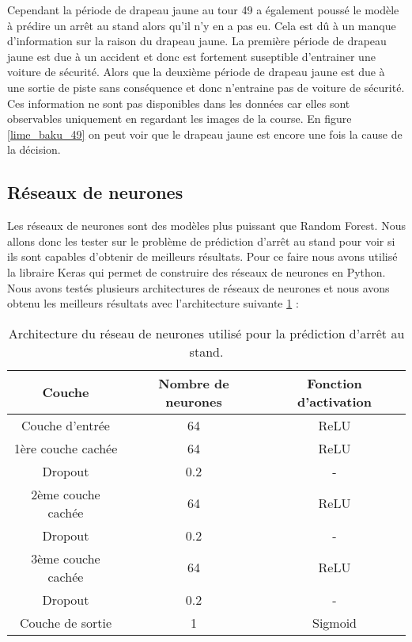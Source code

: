 Cependant la période de drapeau jaune au tour 49 a également poussé le modèle à prédire un arrêt au stand alors qu'il n'y en a pas eu.
Cela est dû à un manque d'information sur la raison du drapeau jaune. La première période de drapeau jaune est due à un accident et donc est fortement suseptible d'entrainer une voiture de sécurité.
Alors que la deuxième période de drapeau jaune est due à une sortie de piste sans conséquence et donc n'entraine pas de voiture de sécurité.
Ces information ne sont pas disponibles dans les données car elles sont observables uniquement en regardant les images de la course.
En figure \ref{lime_baku_49} on peut voir que le drapeau jaune est encore une fois la cause de la décision.

\subsection{Réseaux de neurones}
Les réseaux de neurones sont des modèles plus puissant que Random Forest. Nous allons donc les tester sur le problème de prédiction d'arrêt au stand
pour voir si ils sont capables d'obtenir de meilleurs résultats. Pour ce faire nous avons utilisé la libraire Keras \cite{chollet2015keras} qui permet de construire des réseaux de neurones en Python.
Nous avons testés plusieurs architectures de réseaux de neurones et nous avons obtenu les meilleurs résultats avec l'architecture suivante \ref{neural_network_architecture} :
\begin{table}[H]
    \begin{center}
        \begin{tabular}{|c|c|c|}
            Couche             & Nombre de neurones & Fonction d'activation \\
            \hline
            Couche d'entrée    & 64                 & ReLU                  \\
            1ère couche cachée & 64                 & ReLU                  \\
            Dropout            & 0.2                & -                     \\
            2ème couche cachée & 64                 & ReLU                  \\
            Dropout            & 0.2                & -                     \\
            3ème couche cachée & 64                 & ReLU                  \\
            Dropout            & 0.2                & -                     \\
            Couche de sortie   & 1                  & Sigmoid               \\
        \end{tabular}
    \end{center}
    \caption{Architecture du réseau de neurones utilisé pour la prédiction d'arrêt au stand.}
    \label{neural_network_architecture}
\end{table}

